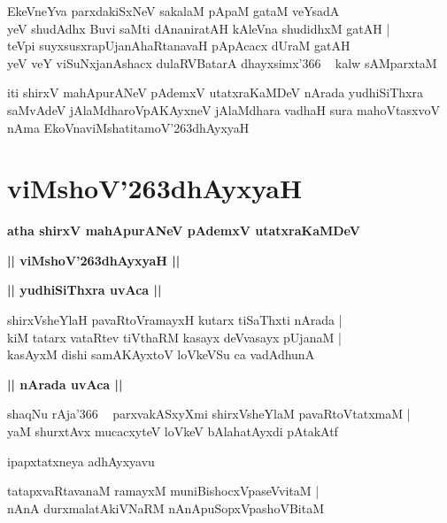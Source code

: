 \documentclass[twoside,12pt,openright]{book}
\def\S{\char'263}
\newcounter{shloka}[chapter]
\def\uvaca#1{\centerline{{\large\textbf{#1}}}}
\begin{document}
\begin{shloka}%
EkeVneYva parxdakiSxNeV sakalaM pApaM gataM veYsadA \\
yeV shudAdhx Buvi saMti dAnaniratAH kAleVna shudidhxM gatAH |\\
teVpi suyxsusxrapUjanAhaRtanavaH pApAcacx dUraM gatAH \\
yeV veY viSuNxjanAshacx dulaRVBatarA dhayxsimx\char'366 ~ kalw sAMparxtaM 
\end{shloka}

\begin{center}
iti shirxV mahApurANeV pAdemxV utatxraKaMDeV  nArada yudhiSiThxra saMvAdeV jAlaMdharoVpAKAyxneV  
jAlaMdhara vadhaH sura mahoVtasxvoV nAma EkoVnaviMshatitamoV\S dhAyxyaH 
\end{center}

\chapter{viMshoV\S dhAyxyaH}

\begin{center}
{\LARGE\bfseries atha shirxV mahApurANeV pAdemxV utatxraKaMDeV} 
\end{center}

\begin{center}
{\LARGE\bfseries  || viMshoV\S dhAyxyaH ||}
\end{center}

\uvaca{|| yudhiSiThxra uvAca ||}

\begin{shloka}%
shirxVsheYlaH pavaRtoVramayxH kutarx tiSaThxti nArada |\\
kiM tatarx vataRtev tiVthaRM kasayx deVvasayx pUjanaM |\\
kasAyxM dishi  samAKAyxtoV loVkeVSu ca vadAdhunA 
\end{shloka}

\uvaca{|| nArada uvAca ||}

\begin{shloka}%
shaqNu rAja\char'366 ~ parxvakASxyXmi shirxVsheYlaM pavaRtoVtatxmaM |\\
yaM shurxtAvx mucacxyteV loVkeV bAlahatAyxdi pAtakAtf
\end{shloka}

\begin{center}
ipapxtatxneya adhAyxyavu
\end{center}

\begin{shloka}%
tatapxvaRtavanaM ramayxM muniBishocxVpaseVvitaM |\\
nAnA durxmalatAkiVNaRM nAnApuSopxVpashoVBitaM 
\end{shloka}
\end{document}
